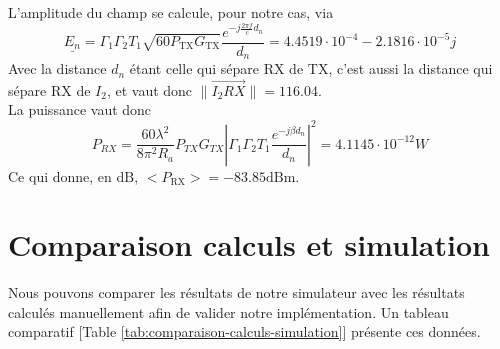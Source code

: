 L'amplitude du champ se calcule, pour notre cas, via
\[ \underline{E_n} = \Gamma_1 \Gamma_2 T_1 \sqrt{60 P_{\mathrm{TX}}
   G_{\mathrm{TX}}} \frac{e^{- j \frac{2 \pi f}{c} d_n}}{d_n} = 4.4519 \cdot
   10^{- 4} - 2.1816 \cdot 10^{- 5} j \]
Avec la distance $d_n$ {\'e}tant celle qui s{\'e}pare $\mathrm{RX}$ de
$\mathrm{TX}$, c'est aussi la distance qui s{\'e}pare $\mathrm{RX}$ de $I_2$, et
vaut donc $\| \overrightarrow{I_2 R X} \| = 116.04$.
\\
La puissance vaut donc
\[ P_{RX} = \frac{60 \lambda^2}{8 \pi^2 R_a} P_{TX} G_{TX} \left| \Gamma_1 \Gamma_2 T_1  \frac{e^{- j \beta d_n}}{d_n} \right|^2
   = 4.1145 \cdot 10^{- 12} W \]
Ce qui donne, en $\mathrm{dB}$, $< P_{\mathrm{RX}} > = - 83.85 \mathrm{dBm}$.


\section{Comparaison calculs et simulation}
Nous pouvons comparer les résultats de notre simulateur avec les résultats calculés manuellement afin de valider notre implémentation. Un tableau comparatif [Table \ref{tab:comparaison-calculs-simulation}] présente ces données.


